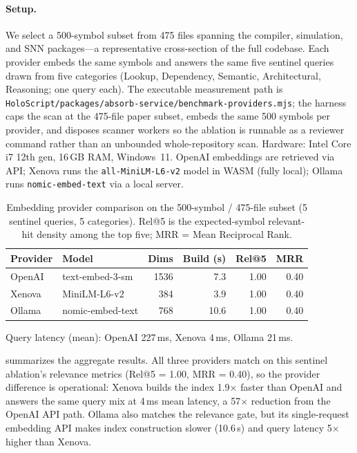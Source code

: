 \documentclass[conference]{IEEEtran}
\providecommand{\measuredFrom}[1]{}
\begin{document}
\paragraph{Setup.} We select a 500-symbol subset from 475 files spanning
the compiler, simulation, and SNN packages---a representative cross-section
of the full codebase. Each provider embeds the same symbols and answers
the same five sentinel queries drawn from five categories (Lookup,
Dependency, Semantic, Architectural, Reasoning; one query each). The
executable measurement path is
\texttt{HoloScript/packages/absorb-service/benchmark-providers.mjs};
the harness caps the scan at the 475-file paper subset, embeds the
same 500 symbols per provider, and disposes scanner workers so the
ablation is runnable as a reviewer command rather than an unbounded
whole-repository scan. Hardware: Intel
Core i7 12th gen, 16\,GB RAM, Windows~11. OpenAI embeddings are
retrieved via API; Xenova runs the \texttt{all-MiniLM-L6-v2} model in
WASM (fully local); Ollama runs \texttt{nomic-embed-text} via a local
server.

\begin{table}[t]
  \centering
  \caption{Embedding provider comparison on the 500-symbol / 475-file
    subset (5 sentinel queries, 5 categories). Rel@5 is the
    expected-symbol relevant-hit density among the top five; MRR =
    Mean Reciprocal Rank.}
  \label{tab:embedding-providers}
  \measuredFrom{HoloScript/packages/absorb-service/benchmark-providers.mjs}%
  \begin{tabular}{llrrrr}
    \toprule
    \textbf{Provider} & \textbf{Model} & \textbf{Dims} &
      \textbf{Build (s)} & \textbf{Rel@5} & \textbf{MRR} \\
    \midrule
    OpenAI & text-embed-3-sm & 1536 & 7.3 & 1.00 & 0.40 \\
    Xenova & MiniLM-L6-v2 & 384  & 3.9 & 1.00 & 0.40 \\
    Ollama & nomic-embed-text & 768  & 10.6 & 1.00 & 0.40 \\
    \bottomrule
  \end{tabular}
  \vspace{0.3em}
  {\footnotesize Query latency (mean): OpenAI 227\,ms, Xenova 4\,ms,
    Ollama 21\,ms.}
\end{table}

 summarizes the aggregate results.
All three providers match on this sentinel ablation's relevance metrics
(Rel@5 = 1.00, MRR = 0.40), so the provider difference is operational:
Xenova builds the index 1.9$\times$ faster than OpenAI and answers the
same query mix at 4\,ms mean latency, a 57$\times$ reduction from the
OpenAI API path. Ollama also matches the relevance gate, but its
single-request embedding API makes index construction slower (10.6\,s)
and query latency 5$\times$ higher than Xenova.
\end{document}
